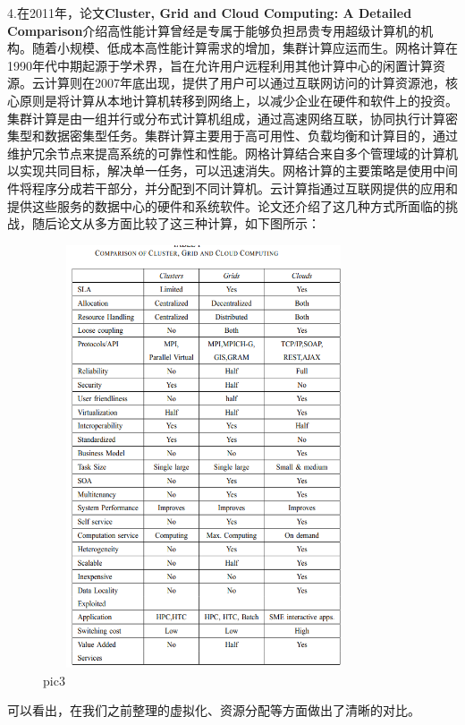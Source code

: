 \documentclass[a4paper,twoside]{scrbook}
\begin{document}
4.在2011年，论文\textbf{Cluster, Grid and Cloud Computing: A Detailed Comparison}介绍高性能计算曾经是专属于能够负担昂贵专用超级计算机的机构。随着小规模、低成本高性能计算需求的增加，集群计算应运而生。网格计算在1990年代中期起源于学术界，旨在允许用户远程利用其他计算中心的闲置计算资源。云计算则在2007年底出现，提供了用户可以通过互联网访问的计算资源池，核心原则是将计算从本地计算机转移到网络上，以减少企业在硬件和软件上的投资。集群计算是由一组并行或分布式计算机组成，通过高速网络互联，协同执行计算密集型和数据密集型任务。集群计算主要用于高可用性、负载均衡和计算目的，通过维护冗余节点来提高系统的可靠性和性能。网格计算结合来自多个管理域的计算机以实现共同目标，解决单一任务，可以迅速消失。网格计算的主要策略是使用中间件将程序分成若干部分，并分配到不同计算机。云计算指通过互联网提供的应用和提供这些服务的数据中心的硬件和系统软件。论文还介绍了这几种方式所面临的挑战，随后论文从多方面比较了这三种计算，如下图所示：
\begin{figure}
\centering %
\includegraphics[height=12.5cm,width=9.5cm]{c c g compaerd.png}
\caption{pic3}
\end{figure}
可以看出，在我们之前整理的虚拟化、资源分配等方面做出了清晰的对比。
\end{document}
